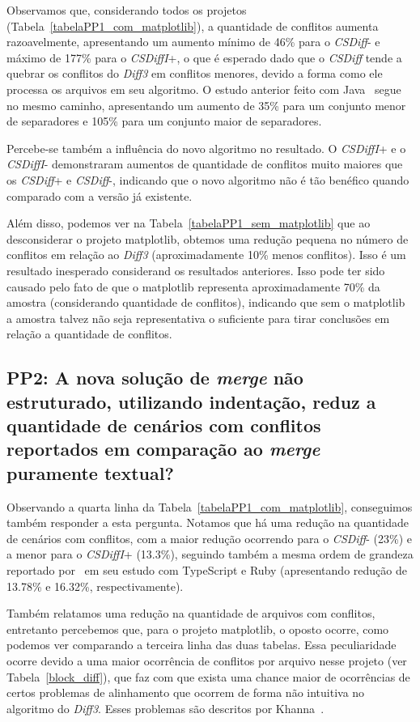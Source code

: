 Observamos que, considerando todos os projetos
(Tabela~\ref{tabelaPP1_com_matplotlib}), a quantidade de conflitos aumenta
razoavelmente, apresentando um aumento mínimo de 46\% para o \emph{CSDiff}- e
máximo de 177\% para o \emph{CSDiffI}+, o que é esperado dado que o
\emph{CSDiff} tende a quebrar os conflitos do \emph{Diff3} em conflitos
menores, devido a forma como ele processa os arquivos em seu algoritmo. O
estudo anterior feito com Java~\cite{clem21} segue no mesmo caminho,
apresentando um aumento de 35\% para um conjunto menor de separadores e 105\%
para um conjunto maior de separadores.

Percebe-se também a influência do novo algoritmo no resultado. O
\emph{CSDiffI}+ e o \emph{CSDiffI}- demonstraram aumentos de quantidade de
conflitos muito maiores que os \emph{CSDiff}+ e \emph{CSDiff}-, indicando que o
novo algoritmo não é tão benéfico quando comparado com a versão já existente.

Além disso, podemos ver na Tabela~\ref{tabelaPP1_sem_matplotlib} que ao
desconsiderar o projeto matplotlib, obtemos uma redução pequena no número de
conflitos em relação ao \emph{Diff3} (aproximadamente 10\% menos conflitos).
Isso é um resultado inesperado considerand os resultados anteriores. Isso pode
ter sido causado pelo fato de que o matplotlib representa aproximadamente 70\%
da amostra (considerando quantidade de conflitos), indicando que sem o
matplotlib a amostra talvez não seja representativa o suficiente para tirar
conclusões em relação a quantidade de conflitos.

\subsection{PP2: A nova solução de \emph{merge} não estruturado, utilizando
indentação, reduz a quantidade de cenários com conflitos reportados em
comparação ao \emph{merge} puramente textual?}\label{resultado_pp2}

Observando a quarta linha da Tabela~\ref{tabelaPP1_com_matplotlib}, conseguimos
também responder a esta pergunta. Notamos que há uma redução na quantidade de
cenários com conflitos, com a maior redução ocorrendo para o \emph{CSDiff}-
(23\%) e a menor para o \emph{CSDiffI}+ (13.3\%), seguindo também a mesma ordem
de grandeza reportado por~\cite{heitor21} em seu estudo com TypeScript e Ruby
(apresentando redução de 13.78\% e 16.32\%, respectivamente).

Também relatamos uma redução na quantidade de arquivos com conflitos,
entretanto percebemos que, para o projeto matplotlib, o oposto ocorre, como
podemos ver comparando a terceira linha das duas tabelas. Essa peculiaridade
ocorre devido a uma maior ocorrência de conflitos por arquivo nesse projeto
(ver Tabela~\ref{block_diff}), que faz com que exista uma chance maior de
ocorrências de certos problemas de alinhamento que ocorrem de forma não
intuitiva no algoritmo do \emph{Diff3}. Esses problemas são descritos por
Khanna~\cite{khan07}.

